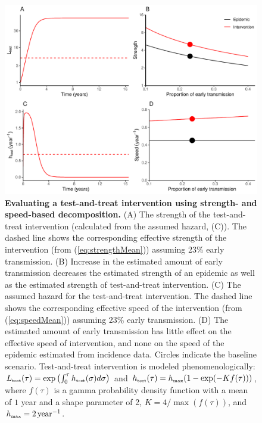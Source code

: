 \documentclass[12pt]{article}
\newcommand{\tsub}[2]{#1_{{\textrm{\tiny #2}}}}
\newcommand{\figlab}[1]{\label{fig:#1}}
\newcommand{\eqref}[1]{(\ref{eq:#1})}
\begin{document}
\begin{figure}[!t]
\includegraphics[width=\textwidth]{../figure/test_and_treat.pdf}
\caption{
\textbf{Evaluating a test-and-treat intervention using strength- and speed-based decomposition.}
(A) The strength of the test-and-treat intervention (calculated from the assumed hazard, (C)). The dashed line shows the corresponding effective strength of the intervention (from \eqref{strengthMean}) assuming 23\% early transmission.
(B) Increase in the estimated amount of early transmission decreases the estimated strength of an epidemic as well as the estimated strength of test-and-treat intervention.
(C) The assumed hazard for the test-and-treat intervention. 
The dashed line shows the corresponding effective speed of the intervention (from \eqref{speedMean}) assuming 23\% early transmission.
(D) The estimated amount of early transmission has little effect on the effective speed of intervention, and none on the speed of the epidemic estimated from incidence data.
Circles indicate the baseline scenario.
Test-and-treat intervention is modeled phenomenologically: $\tsub{L}{test}(\tau) = \exp\left(\int_0^\tau \tsub{h}{test}(\sigma) d\sigma \right)$ and $\tsub{h}{test}(\tau) = \tsub{h}{max} (1 - \exp(- K f(\tau)))$, where $f(\tau)$ is a gamma probability density function with a mean of $1$ year and a shape parameter of 2, $K = 4/\max(f(\tau))$, and $\tsub{h}{max} = 2\,\mathrm{year}^{-1}$.
}
\figlab{test}
\end{figure}
\end{document}
